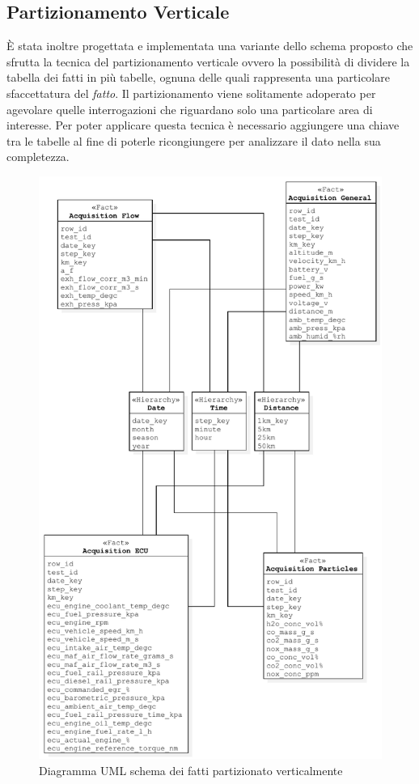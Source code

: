 \subsection{Partizionamento Verticale}
È stata inoltre progettata e implementata una variante dello schema proposto che sfrutta la tecnica del partizionamento verticale ovvero la possibilità di dividere la tabella dei fatti in più tabelle, ognuna delle quali rappresenta una particolare sfaccettatura del \textit{fatto}. Il partizionamento viene solitamente adoperato per agevolare quelle interrogazioni che riguardano solo una particolare area di interesse. Per poter applicare questa tecnica è necessario aggiungere una chiave tra le tabelle al fine di poterle ricongiungere per analizzare il dato nella sua completezza.
\begin{figure}[H]
	\centering
	\includegraphics[scale=0.8]{figures/class_fact_scheme_part} %
	\caption{Diagramma UML schema dei fatti partizionato verticalmente}
	\label{fig:ofm}
\end{figure}
\newpage
